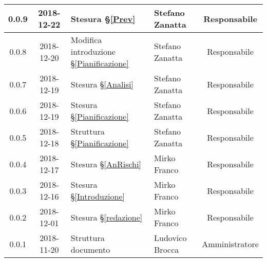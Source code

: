 \begin{center}
\begin{tabularx}{\textwidth}{|c|c|X|X|c|}
			\hline
			0.0.9 & 2018-12-22 & Stesura \S\ref{Prev} & Stefano Zanatta & Responsabile\\
			\hline
			0.0.8 & 2018-12-20 & Modifica introduzione \S\ref{Pianificazione} & Stefano Zanatta & Responsabile\\
			\hline
			0.0.7 & 2018-12-19 & Stesura \S\ref{Analisi}& Stefano Zanatta & Responsabile\\
			\hline
			0.0.6 & 2018-12-19 & Stesura \S\ref{Pianificazione} & Stefano Zanatta & Responsabile\\
			\hline
			0.0.5 & 2018-12-18 & Struttura \S\ref{Pianificazione} & Stefano Zanatta & Responsabile\\
			\hline
			0.0.4 & 2018-12-17 & Stesura \S\ref{AnRischi} & Mirko Franco & Responsabile\\
			\hline
			0.0.3 & 2018-12-16 & Stesura \S\ref{Introduzione} & Mirko Franco& Responsabile\\
			\hline
			0.0.2 & 2018-12-01 & Stesura \S\ref{redazione} & Mirko Franco& Responsabile\\
			\hline
			0.0.1 & 2018-11-20 & Struttura documento & Ludovico Brocca & Amministratore\\
			\hline

		\end{tabularx}
	\end{center}
\newpage
